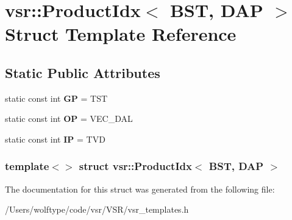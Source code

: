 \hypertarget{structvsr_1_1_product_idx_3_01_b_s_t_00_01_d_a_p_01_4}{\section{vsr\-:\-:Product\-Idx$<$ B\-S\-T, D\-A\-P $>$ Struct Template Reference}
\label{structvsr_1_1_product_idx_3_01_b_s_t_00_01_d_a_p_01_4}
}
\subsection*{Static Public Attributes}
\begin{DoxyCompactItemize}
\item 
\hypertarget{structvsr_1_1_product_idx_3_01_b_s_t_00_01_d_a_p_01_4_a76cc867dc2f0dc4fb1b905f11271bcff}{static const int {\bfseries G\-P} = T\-S\-T}\label{structvsr_1_1_product_idx_3_01_b_s_t_00_01_d_a_p_01_4_a76cc867dc2f0dc4fb1b905f11271bcff}

\item 
\hypertarget{structvsr_1_1_product_idx_3_01_b_s_t_00_01_d_a_p_01_4_af0766275b3b5a0e9d0a4192e2e99cfeb}{static const int {\bfseries O\-P} = V\-E\-C\-\_\-\-D\-A\-L}\label{structvsr_1_1_product_idx_3_01_b_s_t_00_01_d_a_p_01_4_af0766275b3b5a0e9d0a4192e2e99cfeb}

\item 
\hypertarget{structvsr_1_1_product_idx_3_01_b_s_t_00_01_d_a_p_01_4_a9b5bff369b9c02fad57595511d5a0670}{static const int {\bfseries I\-P} = T\-V\-D}\label{structvsr_1_1_product_idx_3_01_b_s_t_00_01_d_a_p_01_4_a9b5bff369b9c02fad57595511d5a0670}

\end{DoxyCompactItemize}
\subsubsection*{template$<$$>$ struct vsr\-::\-Product\-Idx$<$ B\-S\-T, D\-A\-P $>$}



The documentation for this struct was generated from the following file\-:\begin{DoxyCompactItemize}
\item 
/\-Users/wolftype/code/vsr/\-V\-S\-R/vsr\-\_\-templates.\-h\end{DoxyCompactItemize}
